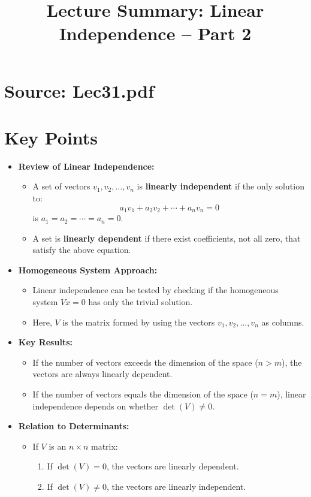 \documentclass{article}
\title{Lecture Summary: Linear Independence – Part 2}
\author{}
\date{}
\begin{document}
\maketitle

\section*{Source: Lec31.pdf}

\section*{Key Points}

\begin{itemize}
  \item \textbf{Review of Linear Independence:}
    \begin{itemize}
      \item A set of vectors $v_1, v_2, \dots, v_n$ is \textbf{linearly independent} if the only solution to:
        \[
          a_1 v_1 + a_2 v_2 + \cdots + a_n v_n = 0
        \]
        is $a_1 = a_2 = \cdots = a_n = 0$.
      \item A set is \textbf{linearly dependent} if there exist coefficients, not all zero, that satisfy the above equation.
    \end{itemize}

  \item \textbf{Homogeneous System Approach:}
    \begin{itemize}
      \item Linear independence can be tested by checking if the homogeneous system $Vx = 0$ has only the trivial solution.
      \item Here, $V$ is the matrix formed by using the vectors $v_1, v_2, \dots, v_n$ as columns.
    \end{itemize}

  \item \textbf{Key Results:}
    \begin{itemize}
      \item If the number of vectors exceeds the dimension of the space ($n > m$), the vectors are always linearly dependent.
      \item If the number of vectors equals the dimension of the space ($n = m$), linear independence depends on whether $\det(V) \neq 0$.
    \end{itemize}

  \item \textbf{Relation to Determinants:}
    \begin{itemize}
      \item If $V$ is an $n \times n$ matrix:
        \begin{enumerate}
          \item If $\det(V) = 0$, the vectors are linearly dependent.
          \item If $\det(V) \neq 0$, the vectors are linearly independent.
        \end{enumerate}
    \end{itemize}
\end{itemize}
\end{document}
